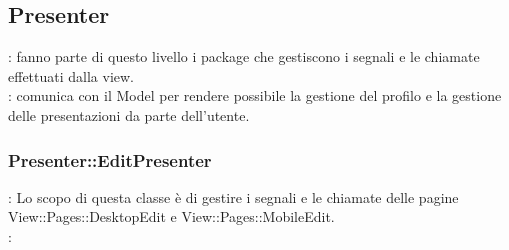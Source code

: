 \subsection{Presenter}{
	\textbf{\tipo}: fanno parte di questo livello i package che gestiscono i segnali e le chiamate effettuati dalla view.\\
	\textbf{\relaz}: comunica con il Model per rendere possibile la gestione del profilo e la gestione delle presentazioni da parte dell'utente.\\
	
	\subsubsection{Presenter::EditPresenter}{
		\textbf{\tipo}: Lo scopo di questa classe è di gestire i segnali e le chiamate delle pagine View::Pages::DesktopEdit e View::Pages::MobileEdit.\\	
		\textbf{\relaz}:
		\begin{itemize}
			

\end{itemize}}}
